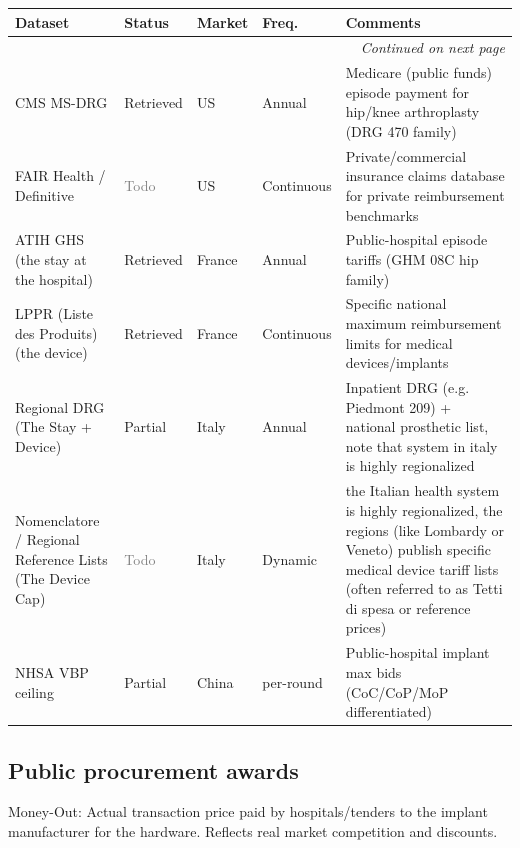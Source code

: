 \documentclass{article}
\begin{document}
\small
\setlength{\tabcolsep}{4pt}
\renewcommand{\arraystretch}{1.15}
\begin{longtable}{@{}p{3.0cm}p{2.0cm}p{2.1cm}p{1.9cm}p{5.8cm}@{}}
\toprule
\textbf{Dataset} & \textbf{Status} & \textbf{Market} & \textbf{Freq.} & \textbf{Comments} \\
\midrule
\endhead
\midrule
\multicolumn{5}{r}{\textit{Continued on next page}} \\
\endfoot
\bottomrule
\endlastfoot
CMS MS-DRG & \textcolor{green!60!black}{Retrieved} & US & Annual & Medicare (public funds) episode payment for hip/knee arthroplasty (DRG 470 family) \\
FAIR Health / Definitive & \textcolor{gray}{Todo} & US & Continuous & Private/commercial insurance claims database for private reimbursement benchmarks \\
ATIH GHS (the stay at the hospital) & \textcolor{green!60!black}{Retrieved} & France & Annual & Public-hospital episode tariffs (GHM 08C hip family) \\
LPPR (Liste des Produits) (the device) & \textcolor{green!60!black}{Retrieved} & France & Continuous & Specific national maximum reimbursement limits for medical devices/implants \\
Regional DRG (The Stay + Device) & \textcolor{orange!85!black}{Partial} & Italy & Annual & Inpatient DRG (e.g. Piedmont 209) + national prosthetic list, note that system in italy is highly regionalized \\
Nomenclatore / Regional Reference Lists (The Device Cap) & \textcolor{gray}{Todo} & Italy & Dynamic & the Italian health system is highly regionalized, the regions (like Lombardy or Veneto) publish specific medical device tariff lists (often referred to as Tetti di spesa or reference prices) \\
NHSA VBP ceiling & \textcolor{orange!85!black}{Partial} & China & per-round & Public-hospital implant max bids (CoC/CoP/MoP differentiated) \\
\end{longtable}
\normalsize

\subsection{Public procurement awards}
Money-Out: Actual transaction price paid by hospitals/tenders to the implant manufacturer for the hardware. Reflects real market competition and discounts.\\[0.5em]
\end{document}
